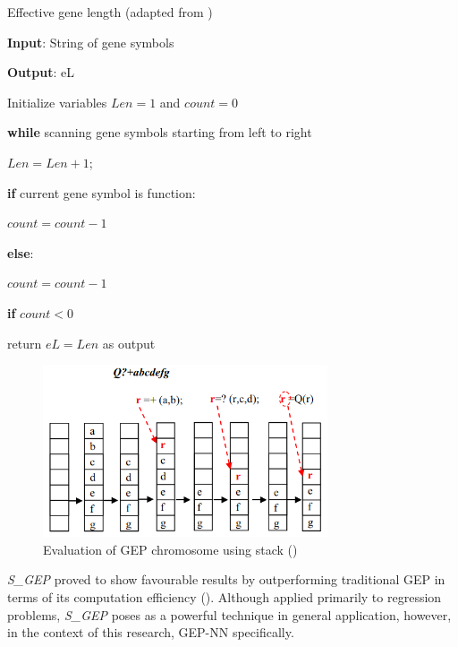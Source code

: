 \parbreak
\begin{algorithm}
	\caption{Effective gene length (adapted from \cite{peng2014improved})}\label{alg:effective_length}
	\begin{algorithmic}[1]
	\item \textbf{Input}: String of gene symbols
	\item \textbf{Output}: eL
	\item Initialize variables $Len=1$ and $count=0$
	\item \textbf{while} scanning gene symbols starting from left to right
	\item \quad $Len = Len + 1$;
	\item \quad \textbf{if} current gene symbol is function:
	\item \quad \quad $count = count - 1$
	\item \quad \textbf{else}:
	\item \quad \quad $count = count - 1$
	\item \quad \textbf{if} $count < 0$
	\item \quad \quad return $eL=Len$ as output
\end{algorithmic}
\end{algorithm}

\parbreak
\begin{figure}[H] %
    \centering %
    \includegraphics[width=0.75\textwidth]{Figures/chapter_gep/gep_stack.png} %
    \caption{Evaluation of GEP chromosome using stack (\cite{peng2014improved})}
    \label{fig:gep_stack} %
\end{figure}

\parbreak\noindent \textit{S\_GEP} proved to show favourable results by outperforming traditional GEP in terms of its computation efficiency (\cite{peng2014improved}). Although applied primarily to regression problems, \textit{S\_GEP} poses as a powerful technique in general application, however, in the context of this research, GEP-NN specifically.

